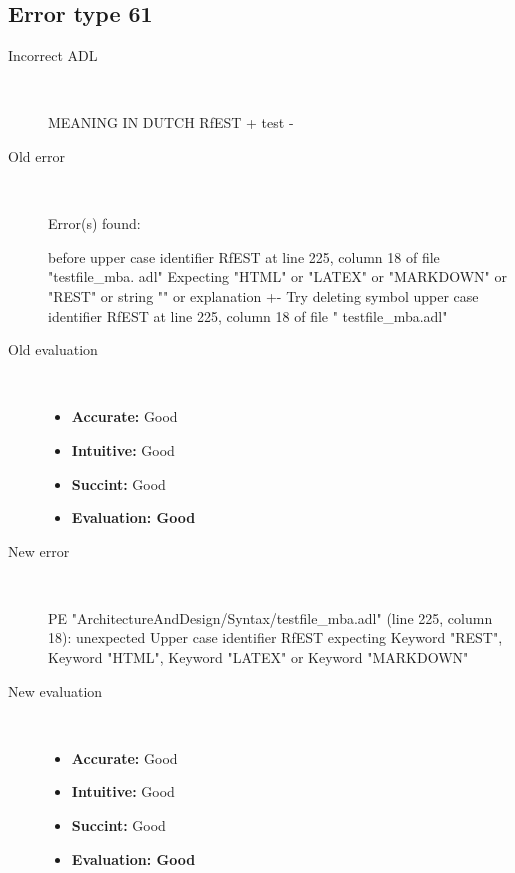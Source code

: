 \subsection{Error type 61}
  \begin{description}
  \item[Incorrect ADL]~\\
\begin{adl}
MEANING IN DUTCH RfEST {+ test -}\end{adl}
  \item[Old error]~\\
\begin{haskell}
Error(s) found:

before upper case identifier RfEST at line 225, column 18 of file "testfile_mba.
adl"
Expecting "HTML" or "LATEX" or "MARKDOWN" or "REST" or string "" or explanation
{+-}
Try deleting symbol upper case identifier RfEST at line 225, column 18 of file "
testfile_mba.adl"\end{haskell}
  \item[Old evaluation]~\\
    \begin{itemize}
    \item \textbf{Accurate:} Good
    \item \textbf{Intuitive:} Good
    \item \textbf{Succint:} Good
    \item \textbf{Evaluation: Good}
    \end{itemize}
  \item[New error]~\\
\begin{haskell}
PE "ArchitectureAndDesign/Syntax/testfile_mba.adl" (line 225, column 18):
unexpected Upper case identifier RfEST
expecting Keyword "REST", Keyword "HTML", Keyword "LATEX" or Keyword "MARKDOWN"
\end{haskell}
  \item[New evaluation]~\\
    \begin{itemize}
    \item \textbf{Accurate:} Good
    \item \textbf{Intuitive:} Good
    \item \textbf{Succint:} Good
    \item \textbf{Evaluation: Good
}
    \end{itemize}
  \end{description}

\hrulefill

